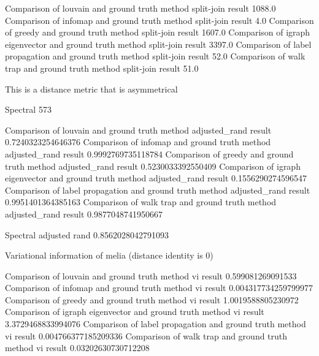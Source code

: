  
 
 
 
 
 







Comparison of louvain and ground truth method split-join result 1088.0
Comparison of infomap and ground truth method split-join result 4.0
Comparison of greedy and ground truth method split-join result 1607.0
Comparison of igraph eigenvector and ground truth method split-join result 3397.0
Comparison of label propagation and ground truth method split-join result 52.0
Comparison of walk trap and ground truth method split-join result 51.0

This is a distance metric that is asymmetrical

Spectral 573


Comparison of louvain and ground truth method adjusted\_rand result 0.7240323254646376
Comparison of infomap and ground truth method adjusted\_rand result 0.9992769735118784
Comparison of greedy and ground truth method adjusted\_rand result 0.5230033392550409
Comparison of igraph eigenvector and ground truth method adjusted\_rand result 0.1556290274596547
Comparison of label propagation and ground truth method adjusted\_rand result 0.9951401364385163
Comparison of walk trap and ground truth method adjusted\_rand result 0.9877048741950667


Spectral adjusted rand
0.8562028042791093

Variational information of melia (distance identity is 0)

Comparison of louvain and ground truth method vi result 0.599081269091533
Comparison of infomap and ground truth method vi result 0.004317734259799977
Comparison of greedy and ground truth method vi result 1.0019588805230972
Comparison of igraph eigenvector and ground truth method vi result 3.3729468833994076
Comparison of label propagation and ground truth method vi result 0.004766377185209336
Comparison of walk trap and ground truth method vi result 0.03202630730712208


